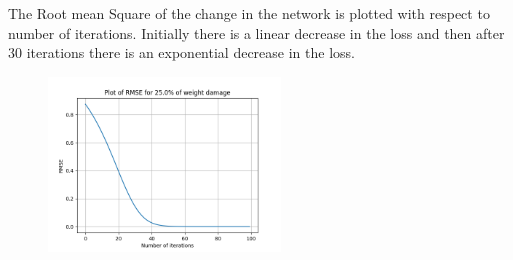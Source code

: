 \documentclass{article}
\begin{document}
\begin{figure}[H]
\hspace{0.001\textwidth}
\end{figure}

The Root mean Square of the change in the network is plotted with respect to number of iterations. Initially there is a linear decrease in the loss and then after 30 iterations there is an exponential decrease in the loss.
\begin{figure}[H]
\includegraphics[width=0.55\textwidth]{Figure_211.png}
\centering
\end{figure}
\end{document}
